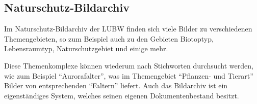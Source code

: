 \subsection{Naturschutz-Bildarchiv} \label{Bilddatenbank}
Im Naturschutz-Bildarchiv der \ac{LUBW} finden sich viele Bilder zu verschiedenen Themengebieten, so zum Beispiel auch zu den Gebieten Biotoptyp, Lebensraumtyp, Naturschutzgebiet und einige mehr.
\cite{Naturschutz-Bildarchiv}

Diese Themenkomplexe k\"onnen wiederum nach Stichworten durchsucht werden, wie zum Beispiel "`Aurorafalter"', was im Themengebiet "`Pflanzen- und Tierart"' Bilder von entsprechenden "`Faltern"' liefert. Auch das Bildarchiv ist ein eigenst\"andiges System, welches seinen eigenen Dokumentenbestand besitzt.


